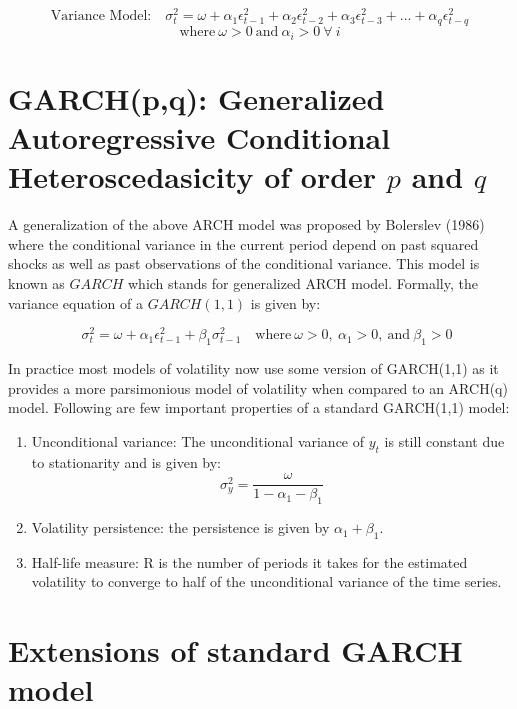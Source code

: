 \documentclass[]{book}
\theoremstyle{definition}
\theoremstyle{definition}
\theoremstyle{definition}
\theoremstyle{remark}
\begin{document}
\[\text{Variance Model:} \quad  \sigma_t^2=\omega +\alpha_1 \epsilon_{t-1}^2+\alpha_2 \epsilon_{t-2}^2 +\alpha_3 \epsilon_{t-3}^2 +...+ \alpha_q \epsilon_{t-q}^2 \]
\[\text{where} \ \omega>0 \ \text{and} \ \alpha_i>0 \ \forall \ i\]

\hypertarget{garchpq-generalized-autoregressive-conditional-heteroscedasicity-of-order-p-and-q}{%
\section{\texorpdfstring{GARCH(p,q): Generalized Autoregressive Conditional Heteroscedasicity of order \(p\) and \(q\)}{GARCH(p,q): Generalized Autoregressive Conditional Heteroscedasicity of order p and q}}\label{garchpq-generalized-autoregressive-conditional-heteroscedasicity-of-order-p-and-q}}

A generalization of the above ARCH model was proposed by Bolerslev (1986) where the conditional variance in the current period depend on past squared shocks as well as past observations of the conditional variance. This model is known as \(GARCH\) which stands for generalized ARCH model. Formally, the variance equation of a \(GARCH(1,1)\) is given by:

\[\quad  \sigma_t^2=\omega +\alpha_1 \epsilon_{t-1}^2 +\beta_1 \sigma^2_{t-1} \quad \text{where} \ \omega>0, \ \alpha_1>0, \ \text{and} \ \beta_1>0 \]

In practice most models of volatility now use some version of GARCH(1,1) as it provides a more parsimonious model of volatility when compared to an ARCH(q) model. Following are few important properties of a standard GARCH(1,1) model:

\begin{enumerate}
\def\labelenumi{\roman{enumi}.}
\item
  Unconditional variance: The unconditional variance of \(y_t\) is still constant due to stationarity and is given by:
  \[\sigma^2_y = \frac{\omega}{1-\alpha_1-\beta_1}\]
\item
  Volatility persistence: the persistence is given by \(\alpha_1+\beta_1\).
\item
  Half-life measure: R is the number of periods it takes for the estimated volatility to converge to half of the unconditional variance of the time series.
\end{enumerate}

\hypertarget{extensions-of-standard-garch-model}{%
\section{Extensions of standard GARCH model}\label{extensions-of-standard-garch-model}}
\end{document}
